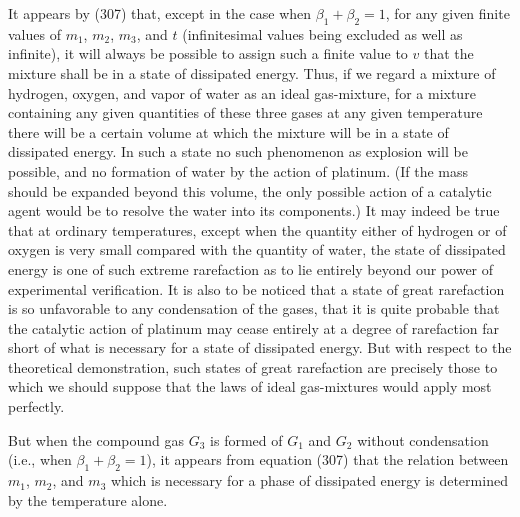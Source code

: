 \documentclass[12pt]{memoir}
\begin{document}
It appears by (307) that, except in the case when $\beta_1+\beta_2=1$, for any given finite values of $m_1$, $m_2$, $m_3$, and $t$ (infinitesimal values being excluded as well as infinite), it will always be possible to assign such a finite value to $v$ that the mixture shall be in a state of dissipated energy.
Thus, if we regard a mixture of hydrogen, oxygen, and vapor of water as an ideal gas-mixture, for a mixture containing any given quantities of these three gases at any given temperature there will be a certain volume at which the mixture will be in a state of dissipated energy.
In such a state no such phenomenon as explosion will be possible, and no formation of water by the action of platinum. (If the mass should be expanded beyond this volume, the only possible action of a catalytic agent would be to resolve the water into its components.) It may indeed be true that at ordinary temperatures, except when the quantity either of hydrogen or of oxygen is very small compared with the quantity of water, the state of dissipated energy is one of such extreme rarefaction as to lie entirely beyond our power of experimental verification. It is also to be noticed that a state of great rarefaction is so unfavorable to any condensation of the gases, that it is quite probable that the catalytic action of platinum may cease entirely at a degree of rarefaction far short of what is necessary for a state of dissipated energy. But with respect to the theoretical demonstration, such states of great rarefaction are precisely those to which we should suppose that the laws of ideal gas-mixtures would apply most perfectly.


But when the compound gas $G_3$ is formed of $G _1$ and $G_2$ without condensation (i.e., when $\beta_1+\beta_2=1$), it appears from equation (307) that the relation between $m_1$, $m_2$, and $m_3$ which is necessary for a phase of dissipated energy is determined by the temperature alone.
\end{document}
